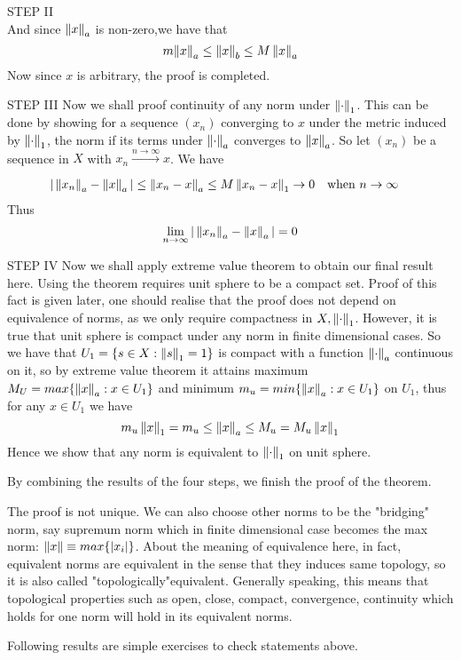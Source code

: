 \begin{theorem}
\begin{pf}{STEP II}{}
$$		$$
		And since ${\left\|{x}\right\|_a}$ is non-zero,we have that
		$$
			m{\left\|{x}\right\|_a}\leq \left\|{x}\right\|_b\leq M\left\|{x}\right\|_a
		$$
		Now since $x$ is arbitrary, the proof is completed.	
	\end{pf}
	\begin{pf}{STEP III}{}
		Now we shall proof continuity of any norm under $\left\|{\cdot}\right\| _1$. This can be done by showing for a sequence $(x_n)$ converging to $x$ under the metric induced by $\left\|{\cdot}\right\|_1$, the norm if its terms under $\left\|{\cdot}\right\|_a$ converges to $\left\|{x}\right\|_a$. So let $(x_n)$ be a sequence in $X$ with $x_n\xrightarrow[]{n\to \infty}x$. We have
		\begin{equation}
			\begin{split}\nonumber
				|\left\|{x_n}\right\|_a-\left\|{x}\right\|_a|&\leq\left\|{x_n-x}\right\|_a\leq M\left\|{x_n-x}\right\|_1\to0\quad \text{when}\,\,n\to\infty
			\end{split}
		\end{equation}
		Thus
		$$
			\lim_{n\to\infty}|\left\|{x_n}\right\|_a-\left\|{x}\right\|_a|=0
		$$
	\end{pf}
\begin{pf}{STEP IV}{}
	Now we shall apply extreme value theorem to obtain our final result here. Using the theorem requires unit sphere to be a compact set. Proof of this fact is given later, one should realise that the proof does not depend on equivalence of norms, as we only require compactness in $X,\left\|{\cdot}\right\|_1$. However, it is true that unit sphere is compact under any norm in finite dimensional cases. So we have that $U_1=\{s\in X:\left\|{s}\right\|_1=1\}$ is compact with  a  function $\left\|{\cdot}\right\|_a$ continuous on it, so by extreme value theorem it attains maximum $M_U=max\{\left\|{x}\right\|_a:x\in U_1\}$ and minimum $m_u=min\{\left\|{x}\right\|_a:x\in U_1\}$ on $U_1$, thus for any $x\in U_1$ we have
	$$
		m_u \left\|{x}\right\|_1=m_u\leq\left\|{x}\right\|_a\leq M_u=M_u \left\|{x}\right\|_1
	$$
	Hence we show that any norm is equivalent to $\left\|{\cdot}\right\|_1$ on unit sphere.
\end{pf}
By combining the results of the four steps, we finish the proof of the theorem.
\end{theorem}

\begin{remark}\rm\nextline
	The proof is not unique. We can also choose other norms to be the "bridging" norm, say supremum norm which in finite dimensional case becomes the max norm: $\left\|{x}\right\|\equiv max\{|x_i|\}$. About the meaning of equivalence here, in fact, equivalent norms are equivalent in the sense that they induces same topology, so it is also called "topologically"equivalent. Generally speaking, this means that topological properties such as open, close, compact, convergence, continuity which holds for one norm will hold in its equivalent norms.
\end{remark}
Following results are simple exercises to check statements above.

